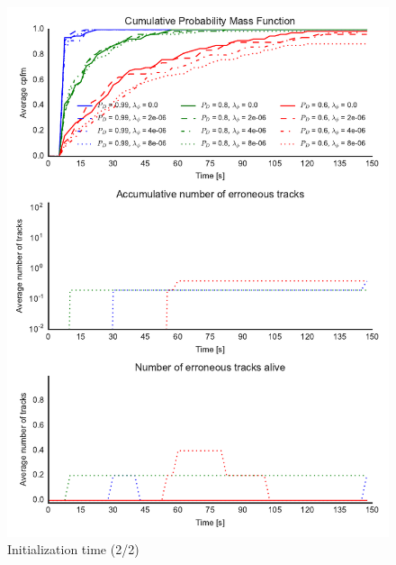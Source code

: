 \begin{figure}
\centering
\includegraphics{Figures/plots/Scenario0_Init-Time(2-2).pdf}
\caption{Initialization time (2/2)}\label{fig:init_time_2-2}
\end{figure}

